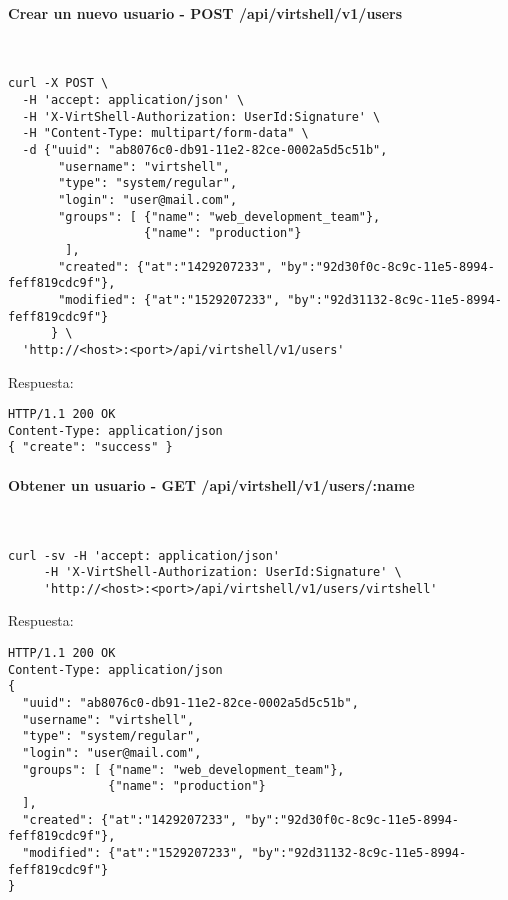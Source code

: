 \paragraph{Crear un nuevo usuario - POST /api/virtshell/v1/users} ~\\

\begin{lstlisting}[style=json]
curl -X POST \
  -H 'accept: application/json' \
  -H 'X-VirtShell-Authorization: UserId:Signature' \
  -H "Content-Type: multipart/form-data" \
  -d {"uuid": "ab8076c0-db91-11e2-82ce-0002a5d5c51b",
       "username": "virtshell", 
       "type": "system/regular",
       "login": "user@mail.com",
       "groups": [ {"name": "web_development_team"},
                   {"name": "production"}
        ],
       "created": {"at":"1429207233", "by":"92d30f0c-8c9c-11e5-8994-feff819cdc9f"},
       "modified": {"at":"1529207233", "by":"92d31132-8c9c-11e5-8994-feff819cdc9f"}
      } \
  'http://<host>:<port>/api/virtshell/v1/users'
\end{lstlisting}

\vspace{1cm}
Respuesta:
\vspace{1cm}

\begin{lstlisting}[style=json]
HTTP/1.1 200 OK
Content-Type: application/json
{ "create": "success" }
\end{lstlisting}

\paragraph{Obtener un usuario - GET /api/virtshell/v1/users/:name} ~\\

\begin{lstlisting}[style=json]
curl -sv -H 'accept: application/json' 
     -H 'X-VirtShell-Authorization: UserId:Signature' \ 
     'http://<host>:<port>/api/virtshell/v1/users/virtshell'
\end{lstlisting}

\vspace{1cm}
Respuesta:
\vspace{1cm}

\begin{lstlisting}[style=json]
HTTP/1.1 200 OK
Content-Type: application/json
{
  "uuid": "ab8076c0-db91-11e2-82ce-0002a5d5c51b",
  "username": "virtshell",
  "type": "system/regular",
  "login": "user@mail.com",
  "groups": [ {"name": "web_development_team"},
              {"name": "production"}
  ],
  "created": {"at":"1429207233", "by":"92d30f0c-8c9c-11e5-8994-feff819cdc9f"},
  "modified": {"at":"1529207233", "by":"92d31132-8c9c-11e5-8994-feff819cdc9f"}
}
\end{lstlisting}

